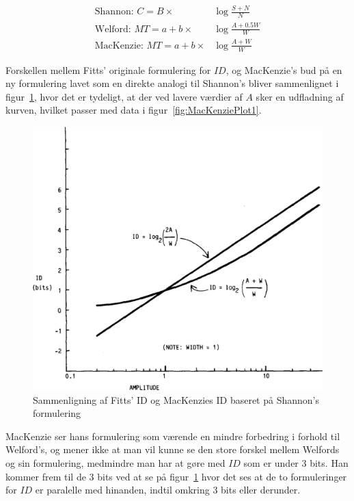 \begin{align}
\text{Shannon: }C=B\times&\log{\frac{S+N}{N}}\\
\text{Welford: }MT=a+b\times&\log{\frac{A+0.5W}{W}}\\
\text{MacKenzie: }MT=a+b\times&\log{\frac{A+W}{W}}
\end{align}

Forskellen mellem Fitts' originale formulering for $ID$, og MacKenzie's bud på en ny formulering lavet som en direkte analogi til Shannon's bliver sammenlignet i figur~\ref{fig:MacKenziePlot2}, hvor det er tydeligt, at der ved lavere værdier af $A$ sker en udfladning af kurven, hvilket passer med data i figur~\ref{fig:MacKenziePlot1}.\\
\begin{figure}[h]
\centering
\includegraphics[scale=0.5]{images/illustrations/mackenzie_plot_2}
\caption{Sammenligning af Fitts' ID og MacKenzies ID baseret på Shannon's formulering}
\label{fig:MacKenziePlot2}
\end{figure}
MacKenzie ser hans formulering som værende en mindre forbedring i forhold til Welford's, og mener ikke at man vil kunne se den store forskel mellem Welfords og sin formulering, medmindre man har at gøre med $ID$ som er under 3 bits. Han kommer frem til de 3 bits ved at se på figur~\ref{fig:MacKenziePlot2} hvor det ses at de to formuleringer for $ID$ er paralelle med hinanden, indtil omkring 3 bits eller derunder.\\

